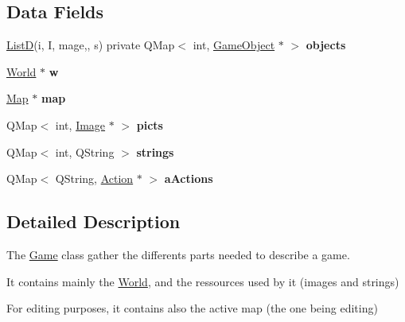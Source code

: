 \subsection*{\-Data \-Fields}
\begin{DoxyCompactItemize}
\item 
\hypertarget{class_game_a7faacf8b374ca68c6e7e396375c5b73d}{\hyperlink{game_8h_a079c21f330a7cc873d15326d90f1b007}{\-List\-D}(i, \-I, mage,, s) private \*
\-Q\-Map$<$ int, \hyperlink{class_game_object}{\-Game\-Object} $\ast$ $>$ {\bfseries objects}}\label{class_game_a7faacf8b374ca68c6e7e396375c5b73d}

\item 
\hypertarget{class_game_a40c1b70c4d67fc2f3ca00ef90ba719fd}{\hyperlink{class_world}{\-World} $\ast$ {\bfseries w}}\label{class_game_a40c1b70c4d67fc2f3ca00ef90ba719fd}

\item 
\hypertarget{class_game_acef3a39fdf14be2c980b0dc11e7be402}{\hyperlink{class_map}{\-Map} $\ast$ {\bfseries map}}\label{class_game_acef3a39fdf14be2c980b0dc11e7be402}

\item 
\hypertarget{class_game_abefc6abe4876fd5f2d407dd7ea21b1da}{\-Q\-Map$<$ int, \hyperlink{class_image}{\-Image} $\ast$ $>$ {\bfseries picts}}\label{class_game_abefc6abe4876fd5f2d407dd7ea21b1da}

\item 
\hypertarget{class_game_aa349faec2222e7ffb942edd039ff7cfe}{\-Q\-Map$<$ int, \-Q\-String $>$ {\bfseries strings}}\label{class_game_aa349faec2222e7ffb942edd039ff7cfe}

\item 
\hypertarget{class_game_a554a490b669b95eb62ae88ce86abfd24}{\-Q\-Map$<$ \-Q\-String, \hyperlink{class_action}{\-Action} $\ast$ $>$ {\bfseries a\-Actions}}\label{class_game_a554a490b669b95eb62ae88ce86abfd24}

\end{DoxyCompactItemize}


\subsection{\-Detailed \-Description}
\-The \hyperlink{class_game}{\-Game} class gather the differents parts needed to describe a game. 

\-It contains mainly the \hyperlink{class_world}{\-World}, and the ressources used by it (images and strings)

\-For editing purposes, it contains also the active map (the one being editing) 

